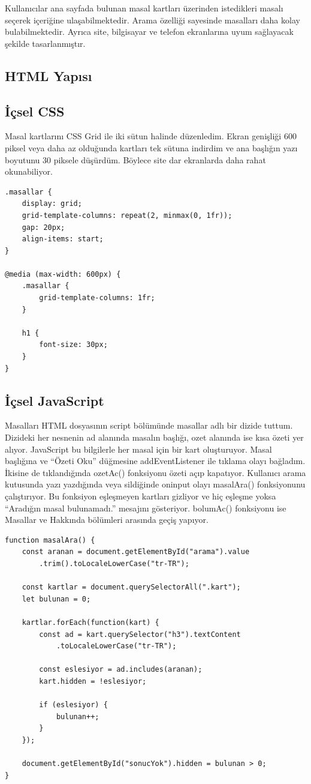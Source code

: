 \documentclass[12pt,a4paper]{article}
\begin{document}
Kullanıcılar ana sayfada bulunan masal kartları üzerinden istedikleri masalı seçerek içeriğine ulaşabilmektedir. Arama özelliği sayesinde masalları daha kolay bulabilmektedir. Ayrıca site, bilgisayar ve telefon ekranlarına uyum sağlayacak şekilde tasarlanmıştır.

\subsection{HTML Yapısı}

\subsection{İçsel CSS}
Masal kartlarını CSS Grid ile iki sütun halinde düzenledim. Ekran genişliği 600 piksel veya daha az olduğunda kartları tek sütuna indirdim ve ana başlığın yazı boyutunu 30 piksele düşürdüm. Böylece site dar ekranlarda daha rahat okunabiliyor.

\begin{lstlisting}[caption={İçsel CSS'ten önemli bir bölüm}]
.masallar {
    display: grid;
    grid-template-columns: repeat(2, minmax(0, 1fr));
    gap: 20px;
    align-items: start;
}

@media (max-width: 600px) {
    .masallar {
        grid-template-columns: 1fr;
    }

    h1 {
        font-size: 30px;
    }
}
\end{lstlisting}

\subsection{İçsel JavaScript}
Masalları HTML dosyasının script bölümünde masallar adlı bir dizide tuttum. Dizideki her nesnenin ad alanında masalın başlığı, ozet alanında ise kısa özeti yer alıyor. JavaScript bu bilgilerle her masal için bir kart oluşturuyor. Masal başlığına ve “Özeti Oku” düğmesine addEventListener ile tıklama olayı bağladım. İkisine de tıklandığında ozetAc() fonksiyonu özeti açıp kapatıyor. Kullanıcı arama kutusunda yazı yazdığında veya sildiğinde oninput olayı masalAra() fonksiyonunu çalıştırıyor. Bu fonksiyon eşleşmeyen kartları gizliyor ve hiç eşleşme yoksa “Aradığın masal bulunamadı.” mesajını gösteriyor. bolumAc() fonksiyonu ise Masallar ve Hakkında bölümleri arasında geçiş yapıyor.

\begin{lstlisting}
function masalAra() {
    const aranan = document.getElementById("arama").value
        .trim().toLocaleLowerCase("tr-TR");

    const kartlar = document.querySelectorAll(".kart");
    let bulunan = 0;

    kartlar.forEach(function(kart) {
        const ad = kart.querySelector("h3").textContent
            .toLocaleLowerCase("tr-TR");

        const eslesiyor = ad.includes(aranan);
        kart.hidden = !eslesiyor;

        if (eslesiyor) {
            bulunan++;
        }
    });

    document.getElementById("sonucYok").hidden = bulunan > 0;
}
\end{lstlisting}
\end{document}
